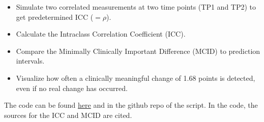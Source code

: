 \documentclass[
]{book}
\providecommand{\tightlist}{%
  \setlength{\itemsep}{0pt}\setlength{\parskip}{0pt}}
\begin{document}
\begin{itemize}
\tightlist
\item
  Simulate two correlated measurements at two time points (TP1 and TP2)
  to get predetermined ICC (\(=\rho\)).
\item
  Calculate the Intraclass Correlation Coefficient (ICC).
\item
  Compare the Minimally Clinically Important Difference (MCID) to prediction intervals.
\item
  Visualize how often a clinically meaningful change of 1.68 points is
  detected, even if no real change has occurred.
\end{itemize}

The code can be found \href{https://github.com/jdegenfellner/ICC_MCID/blob/main/ICC_MCID.R}{here}
and in the github repo of the script. In the code, the sources for the ICC and MCID are
cited.
\end{document}
